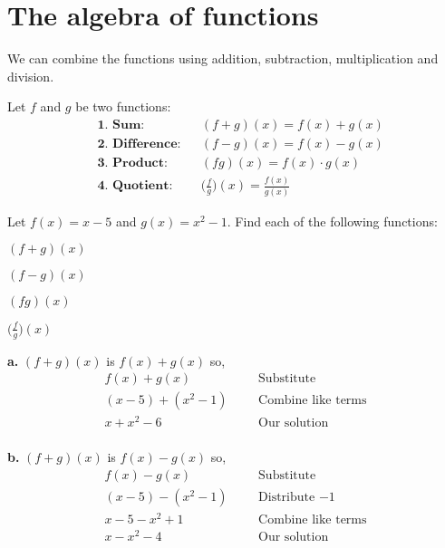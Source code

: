 \section{The algebra of functions}
We can combine the functions using addition, subtraction, multiplication and division.
\begin{tcolorbox}[
                    title=Algebra of functions, fonttitle=\bfseries,
                    colframe=blue!70!red,
                    colback=white]
Let $f$ and $g$ be two functions:
\begin{align*}
    &\textbf{1. Sum:} &     &(f+g)(x) = f(x)+g(x)\\
    &\textbf{2. Difference:} &  &(f-g)(x)= f(x) - g(x)\\
    &\textbf{3. Product:} & &(fg)(x) = f(x)\cdot g(x)\\
    &\textbf{4. Quotient:} &    &\biggl(\frac{f}{g} \biggr)(x)= \frac{f(x)}{g(x)}
\end{align*}
\end{tcolorbox}
\begin{exa}
    Let $f(x) =x-5$ and $g(x) = x^2-1$. Find each of the following functions:
    \begin{enumerate}[\bfseries a.]
    \begin{multicols}{2}
        \item $(f+g)(x)$
        \item $(f-g)(x)$
        \item $(fg)(x)$
        \item $\biggl(\frac{f}{g} \biggr)(x)$
    \end{multicols}
    \end{enumerate}
\end{exa}
\vspace{0.5cm}
\textbf{a. }
$(f+g)(x)$ is $f(x)+g(x)$ so,
\begin{align*}
    f(x)+g(x)&   &   &\text{Substitute}\\
    (x-5) + (x^2-1)&    &   &\text{Combine like terms}\\
    x+x^2-6&    &   &\text{Our solution}
\end{align*}
\\[0.2cm]
\textbf{b. }
$(f+g)(x)$ is $f(x)-g(x)$ so,
\begin{align*}
    f(x)-g(x)&   &   &\text{Substitute}\\
    (x-5) - (x^2-1)&    &   &\text{Distribute $-1$}\\
    x-5-x^2+1&    &   &\text{Combine like terms}\\
    x-x^2-4&    &   &\text{Our solution}
\end{align*}
